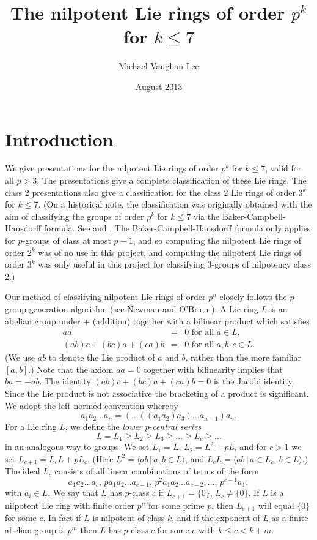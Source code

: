 \documentclass[10pt]{article}
\begin{document}
\title{The nilpotent Lie rings of order $p^{k}$ for $k\leq 7$}
\author{Michael Vaughan-Lee}
\date{August 2013}
\maketitle

\section{Introduction}

We give presentations for the nilpotent Lie rings of order $p^{k}$ for $%
k\leq 7$, valid for all $p>3$. The presentations give a complete
classification of these Lie rings. The class 2 presentations also give a
classification for the class 2 Lie rings of order $3^{k}$ for $k\leq 7$. (On
a historical note, the classification was originally obtained with the aim
of classifying the groups of order $p^{k}$ for $k\leq 7$ via the
Baker-Campbell-Hausdorff formula. See \cite{newobvl} and \cite{obrienvl2}.
The Baker-Campbell-Hausdorff formula only applies for $p$-groups of class at
most $p-1$, and so computing the nilpotent Lie rings of order $2^{k}$ was of
no use in this project, and computing the nilpotent Lie rings of order $%
3^{k} $ was only useful in this project for classifying $3$-groups of
nilpotency class 2.)

Our method of classifying nilpotent Lie rings of order $p^{n}$ closely
follows the $p$-group generation algorithm (see Newman \cite{Newman77} and
O'Brien \cite{OBrien90}). A Lie ring $L$ is an abelian group under $+$
(addition) together with a bilinear product which satisfies 
\begin{eqnarray*}
aa &=&0\text{ for all }a\in L, \\
(ab)c+(bc)a+(ca)b &=&0\text{ for all }a,b,c\in L.
\end{eqnarray*}%
(We use $ab$ to denote the Lie product of $a$ and $b$, rather than the more
familiar $[a,b]$.) Note that the axiom $aa=0$ together with bilinearity
implies that $ba=-ab$. The identity $(ab)c+(bc)a+(ca)b=0$ is the Jacobi
identity. Since the Lie product is not associative the bracketing of a
product is significant. We adopt the left-normed convention whereby 
\[
a_{1}a_{2}\ldots a_{n}=(\ldots ((a_{1}a_{2})a_{3})\ldots a_{n-1})a_{n}. 
\]%
For a Lie ring $L$, we define the \textit{lower }$p$-\textit{central series} 
\[
L=L_{1}\geq L_{2}\geq L_{3}\geq \ldots \geq L_{c}\geq \ldots 
\]%
in an analogous way to groups. We set $L_{1}=L$, $L_{2}=L^{2}+pL$, and for $%
c>1$ we set $L_{c+1}=L_{c}L+pL_{c}$. (Here $L^{2}=\langle ab\,|\,a,b\in
L\rangle $, and $L_{c}L=\langle ab\,|\,a\in L_{c},\,b\in L\rangle $.) The
ideal $L_{c}$ consists of all linear combinations of terms of the form 
\[
a_{1}a_{2}\ldots a_{c},\,pa_{1}a_{2}\ldots a_{c-1},\,p^{2}a_{1}a_{2}\ldots
a_{c-2},\ldots ,\,p^{c-1}a_{1}, 
\]%
with $a_{i}\in L$. We say that $L$ has $p$-class $c$ if $L_{c+1}=\{0\}$, $%
L_{c}\neq \{0\}$. If $L$ is a nilpotent Lie ring with finite order $p^{n}$
for some prime $p$, then $L_{c+1}$ will equal $\{0\}$ for some $c$. In fact
if $L$ is nilpotent of class $k$, and if the exponent of $L$ as a finite
abelian group is $p^{m}$ then $L$ has $p$-class $c$ for some $c$ with $k\leq
c<k+m$.
\end{document}
